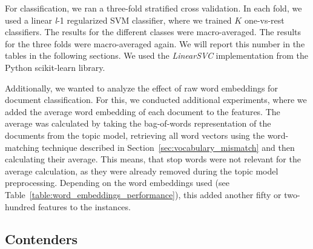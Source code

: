 \documentclass[
        a4paper,
        titlepage,
        twoside,
        parskip
        ]{scrbook}
\theoremstyle{break}
\begin{document}
For classification, we ran a three-fold stratified cross validation.
In each fold, we used a linear \emph{l}-1 regularized SVM classifier, where we trained $K$ one-vs-rest classifiers.
The results for the different classes were macro-averaged.
The results for the three folds were macro-averaged again.
We will report this number in the tables in the following sections.
We used the \emph{LinearSVC} implementation from the Python scikit-learn \cite{Pedregosa2012} library.

Additionally, we wanted to analyze the effect of raw word embeddings for document classification.
For this, we conducted additional experiments, where we added the average word embedding of each document to the features.
The average was calculated by taking the bag-of-words representation of the documents from the topic model, retrieving all word vectors using the word-matching technique described in Section~\ref{sec:vocabulary_mismatch} and then calculating their average.
This means, that stop words were not relevant for the average calculation, as they were already removed during the topic model preprocessing.
Depending on the word embeddings used (see Table~\ref{table:word_embeddings_performance}), this added another fifty or two-hundred features to the instances.

\subsection{Contenders}
\end{document}
